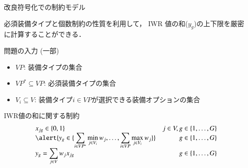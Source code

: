 \documentclass[dvipdfmx, 11pt,]{beamer}
\begin{document}
\begin{frame}{改良符号化での制約モデル}
  \begin{alertblock}{}
      必須装備タイプと個数制約の性質を利用して，
      IWR 値の和($y_g$)の上下限を厳密に計算することができる．
  \end{alertblock}

  \begin{block}{問題の入力 (一部)}
    \begin{itemize}\compress
    \item $VP$: 装備タイプの集合
    \item $VP^{*}\subseteq VP$: 必須装備タイプの集合
    \item $V_{i}\subseteq V$: 装備タイプ$i\in VP$が選択できる装備オプションの集合
    \end{itemize}
  \end{block}

  \begin{block}{IWR値の和に関する制約}
  \[
    \begin{array}{lr}
      x_{jg}\in\{0,1\} & j\in V, g\in\{1,\ldots,G\} \\
      \alert{y_{g}\in\{\displaystyle\sum_{i\in VP^{*}}\min_{j\in
      V_{i}}w_{j},\ldots, \sum_{i\in VP}\max_{j\in V_{i}}w_{j}\}} 
      & g\in\{1,\ldots,G\} \\
      y_{g} = \displaystyle\sum_{j\in V}w_{j}x_{jg} & g\in\{1,\ldots,G\}
    \end{array}
  \]
  \end{block}
\end{frame}

\end{document}

